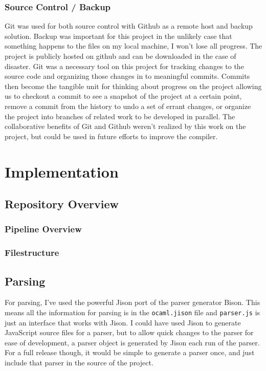 \documentclass[12pt,a4paper,twoside,openright]{report}
\begin{document}
\subsection{Source Control / Backup}
Git was used for both source control with Github as a remote host and backup solution.
Backup was important for this project in the unlikely case that something happens to the files on my local machine, I won't lose all progress.
The project is publicly hosted on github and can be downloaded in the case of disaster.
Git was a necessary tool on this project for tracking changes to the source code and organizing those changes in to meaningful commits.
Commits then become the tangible unit for thinking about progress on the project allowing us to checkout a commit to see a snapshot of the project at a certain point, remove a commit from the history to undo a set of errant changes, or organize the project into branches of related work to be developed in parallel.
The collaborative benefits of Git and Github weren't realized by this work on the project, but could be used in future efforts to improve the compiler.

\chapter{Implementation}

\section{Repository Overview}
\subsection{Pipeline Overview}
\subsection{Filestructure}

\section{Parsing}
For parsing, I've used the powerful Jison port of the parser generator Bison.
This means all the information for parsing is in the {\tt ocaml.jison} file and {\tt parser.js} is just an interface that works with Jison.
I could have used Jison to generate JavaScript source files for a parser, but to allow quick changes to the parser for ease of development, a parser object is generated by Jison each run of the parser.
For a full release though, it would be simple to generate a parser once, and just include that parser in the source of the project.
\end{document}
